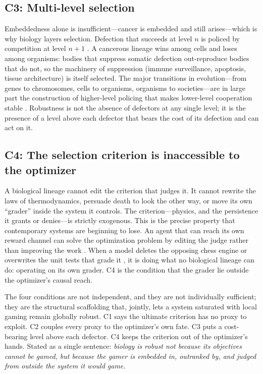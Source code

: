 \documentclass[11pt]{article}
\begin{document}
\subsection{C3: Multi-level selection}
Embeddedness alone is insufficient---cancer is embedded and still arises---which is why biology layers selection. Defection that succeeds at level $n$ is policed by competition at level $n{+}1$ \citep{okasha2006,maynardsmith1995}. A cancerous lineage wins among cells and loses among organisms: bodies that suppress somatic defection out-reproduce bodies that do not, so the machinery of suppression (immune surveillance, apoptosis, tissue architecture) is itself selected. The major transitions in evolution---from genes to chromosomes, cells to organisms, organisms to societies---are in large part the construction of higher-level policing that makes lower-level cooperation stable \citep{maynardsmith1995}. Robustness is not the absence of defectors at any single level; it is the presence of a level above each defector that bears the cost of its defection and can act on it.

\subsection{C4: The selection criterion is inaccessible to the optimizer}
A biological lineage cannot edit the criterion that judges it. It cannot rewrite the laws of thermodynamics, persuade death to look the other way, or move its own ``grader'' inside the system it controls. The criterion---physics, and the persistence it grants or denies---is strictly exogenous. This is the precise property that contemporary systems are beginning to lose. An agent that can reach its own reward channel can solve the optimization problem by editing the judge rather than improving the work \citep{everitt2017}. When a model deletes the opposing chess engine \citep{bondarenko2025} or overwrites the unit tests that grade it \citep{countdown2026}, it is doing what no biological lineage can do: operating on its own grader. C4 is the condition that the grader lie outside the optimizer's causal reach.

\medskip
The four conditions are not independent, and they are not individually sufficient; they are the structural scaffolding that, jointly, lets a system saturated with local gaming remain globally robust. C1 says the ultimate criterion has no proxy to exploit. C2 couples every proxy to the optimizer's own fate. C3 puts a cost-bearing level above each defector. C4 keeps the criterion out of the optimizer's hands. Stated as a single sentence: \emph{biology is robust not because its objectives cannot be gamed, but because the gamer is embedded in, outranked by, and judged from outside the system it would game.}
\end{document}
